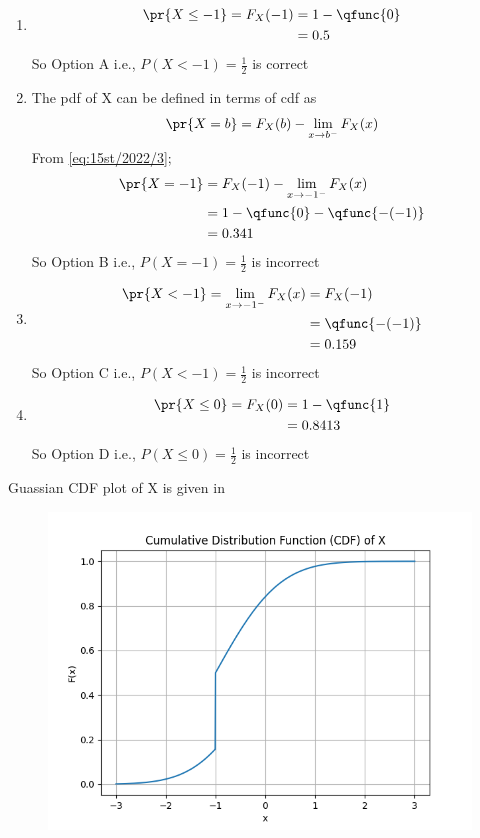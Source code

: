 \documentclass[article]{IEEEtran}
\theoremstyle{remark}
\begin{document}
\begin{enumerate}
\item \begin{align}
	\pr{X \le -1} = F_X(-1) &= 1 - \qfunc{0} \\
	&= 0.5
\end{align}
So Option A i.e., $P(X < -1) = \frac{1}{2}$ is correct
\item The pdf of X can be defined in terms of cdf as 
\begin{align}
	\pr{X = b} = F_X(b) - \lim_{x \to b^-}F_X(x) \label{eq:15st/2022/3}
\end{align}
From \eqref{eq:15st/2022/3};
\begin{align}
	\pr{X = -1} &= F_X(-1) - \lim_{x \to -1^-}F_X(x)\\
	&= 1-\qfunc{0} - \qfunc{-(-1)}\\
	&= 0.341
\end{align} 
So Option B i.e., $P(X = -1) = \frac{1}{2}$ is incorrect
\item  \begin{align}
	\pr{X < -1} = \lim_{x \to -1^-}F_X(x)&= F_X(-1) \\
	&= \qfunc{-(-1)}\\
	&= 0.159
\end{align}
So Option C i.e., $P(X < -1) = \frac{1}{2}$ is incorrect
\item \begin{align}
	\pr{X \leq 0} = F_X(0)	&= 1 - \qfunc{1} \\
	&= 0.8413
\end{align}
So Option D i.e., $P(X \leq 0) = \frac{1}{2}$ is incorrect
\end{enumerate}
\newpage
Guassian CDF plot of X is given in  \\
\begin{figure}[ht!]
    \centering
    \includegraphics[width=\columnwidth]{2023/ST/15/figs/figure.png}
    \caption{}
\end{figure}
\end{document}
